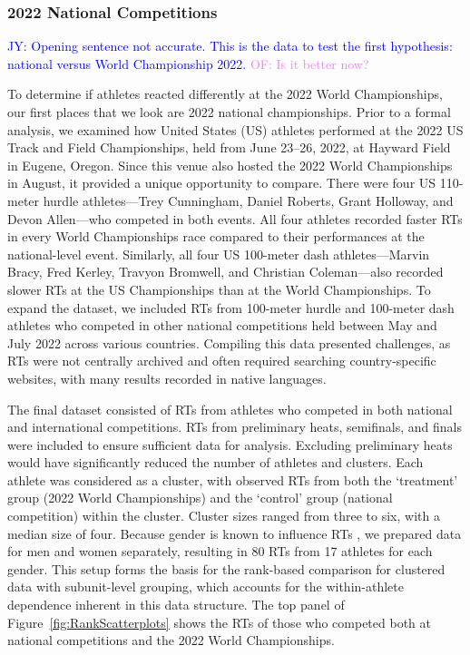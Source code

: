 \documentclass[12pt, letterpaper]{article}
\newcommand{\jy}[1]{\textcolor{blue}{JY: #1}}
\newcommand{\of}[1]{\textcolor{violet}{OF: #1}}
\begin{document}
\subsubsection{2022 National Competitions}
\label{sec:datanational}

\jy{Opening sentence not accurate. This is the data to test the first
  hypothesis: national versus World Championship 2022.}
\of{Is it better now?}


To determine if athletes reacted differently at the 2022 World Championships,
our first places that we look are 2022 national championships.
Prior to a formal analysis, we examined how United States (US) athletes
performed at the 2022 US Track and Field Championships, held from June 23--26,
2022, at Hayward Field in Eugene, Oregon. Since this venue also hosted
the 2022 World Championships in August, it
provided a unique opportunity to compare. There were four US
110-meter hurdle athletes—Trey Cunningham, Daniel Roberts,
Grant Holloway, and Devon Allen—who competed in both events. All four
athletes recorded faster RTs in every World Championships race
compared to their performances at the national-level event. Similarly,
all four US 100-meter dash athletes---Marvin Bracy, Fred Kerley,
Travyon Bromwell, and Christian Coleman---also recorded slower RTs at
the US Championships than at the World Championships.
To expand the dataset, we included RTs from 100-meter hurdle
and 100-meter dash athletes who competed in other national
competitions held between May and July 2022 across various
countries. Compiling this data presented challenges, as RTs were not
centrally archived and often required searching country-specific
websites, with many results recorded in native languages.


The final dataset consisted of RTs from athletes who competed
in both national and international competitions. RTs from
preliminary heats, semifinals, and finals were included to ensure
sufficient data for analysis. Excluding preliminary heats would have
significantly reduced the number of athletes and clusters. Each
athlete was considered as a cluster, with observed RTs
from both the `treatment' group (2022 World Championships) and
the `control' group (national competition) within the cluster. Cluster
sizes ranged from three to six, with a median size of four. Because gender
is known to influence RTs \citep{babicc2009reaction,
  lipps2011implications}, we prepared data for men and women
separately, resulting in 80 RTs from 17 athletes for each
gender. This setup forms the basis for the rank-based comparison for
clustered data with subunit-level grouping, which accounts for the
within-athlete dependence inherent in this data structure. The top
panel of Figure~\ref{fig:RankScatterplots} shows the RTs
of those who competed both at national competitions and the 2022 World
Championships.
\end{document}
